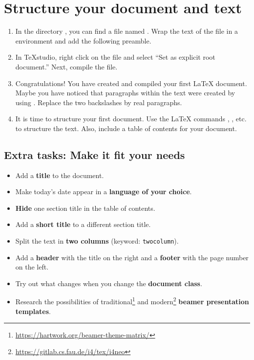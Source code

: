 \section{Structure your document and text}

\begin{enumerate}
	\item In the directory , you can find a file named . Wrap the text of the file in a  environment and add the following preamble. 
	\item In TeXstudio, right click on the file and select \enquote{Set as explicit root document.} Next, compile the file.
	\item Congratulations! You have created and compiled your first \LaTeX{} 
	document. Maybe you have noticed that paragraphs within the text were 
	created by using . Replace the 
	two backslashes by real paragraphs.
	\item It is time to structure your first document. Use the \LaTeX{} 
	commands , 
	, etc. to structure the text. 
	Also, include a table of contents for your document.
\end{enumerate}

\subsection*{Extra tasks: Make it fit your needs}

\begin{itemize}
	\item Add a \textbf{title} to the document.
	\item Make today's date appear in a \textbf{language of your choice}.
	\item \textbf{Hide} one section title in the table of contents.
	\item Add a \textbf{short title} to a different section title.
	\item Split the text in \textbf{two columns} (keyword: \texttt{twocolumn}).
	\item Add a \textbf{header} with the title on the right and a \textbf{footer} with the page number on the left.
	\item Try out what changes when you change the \textbf{document class}.
	\item Research the possibilities of traditional\footnote{\url{https://hartwork.org/beamer-theme-matrix/}} and modern\footnote{\url{https://gitlab.cs.fau.de/i4/tex/i4neo}} \textbf{beamer presentation templates}.
\end{itemize}